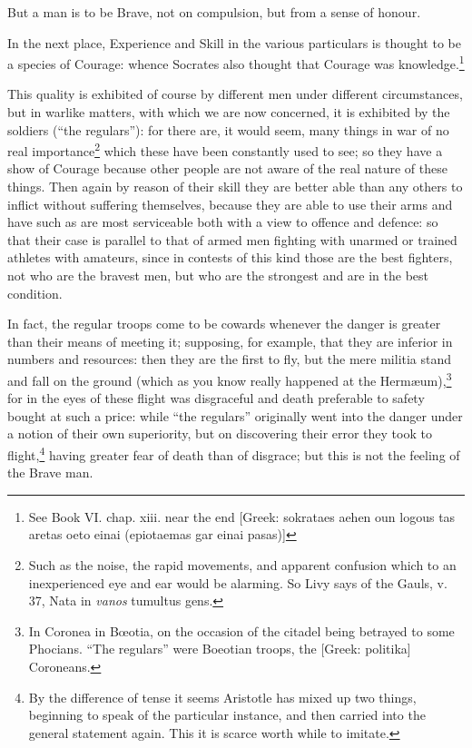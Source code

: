 But a man is to be Brave, not on compulsion, but from a sense of honour.

In the next place, Experience and Skill in the various particulars is thought
to be a species of Courage: whence Socrates also thought that Courage was
knowledge.\footnote{See Book VI. chap. xiii. near the end [Greek: sokrataes aehen oun logous tas
aretas oeto einai (epiotaemas gar einai pasas)]}

This quality is exhibited of course by different men under different
circumstances, but in warlike matters, with which we are now concerned, it is
exhibited by the soldiers (“the regulars”): for there are, it would
seem, many things in war of no real importance\footnote{Such as the noise, the rapid movements, and apparent confusion which to an
inexperienced eye and ear would be alarming. So Livy says of the Gauls, v. 37,
Nata in \emph{vanos} tumultus gens.}
which these have been constantly used to see; so they have a show of Courage
because other people are not aware of the real nature of these things. Then
again by reason of their skill they are better able than any others to inflict
without suffering themselves, because they are able to use their arms and have
such as are most serviceable both with a view to offence and defence: so that
their case is parallel to that of armed men fighting with unarmed or trained
athletes with amateurs, since in contests of this kind those are the best
fighters, not who are the bravest men, but who are the strongest and are in the
best condition.

In fact, the regular troops come to be cowards whenever the danger is greater
than their means of meeting it; supposing, for example, that they are inferior
in numbers and resources: then they are the first to fly, but the mere militia
stand and fall on the ground (which as you know really happened at the
Hermæum),\footnote{In Coronea in Bœotia, on the occasion of the citadel being betrayed to some
Phocians. “The regulars” were Boeotian troops, the [Greek:
politika] Coroneans.}
for in the eyes of these flight was disgraceful and death preferable to safety
bought at such a price: while “the regulars” originally went into
the danger under a notion of their own superiority, but on discovering their
error they took to flight,\footnote{By the difference of tense it seems Aristotle has mixed up two things,
beginning to speak of the particular instance, and then carried into the
general statement again. This it is scarce worth while to imitate.}
having greater fear of death than of disgrace; but this is not the feeling of
the Brave man.

